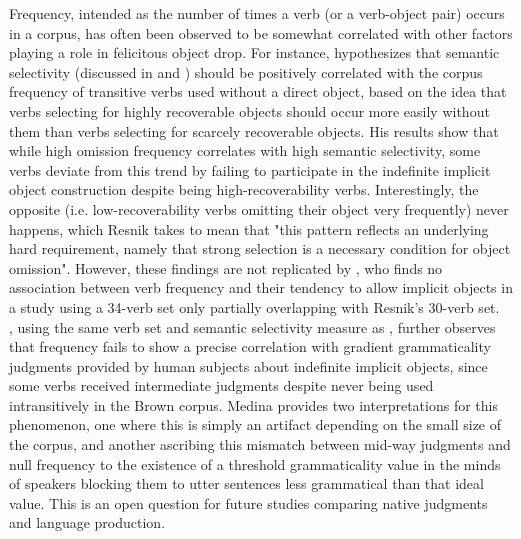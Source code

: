 Frequency, intended as the number of times a verb (or a verb-object pair) occurs in a corpus, has often been observed to be somewhat correlated with other factors playing a role in felicitous object drop. For instance, \textcite[149-151]{Resnik1996} hypothesizes that semantic selectivity (discussed in  and ) should be positively correlated with the corpus frequency of transitive verbs used without a direct object, based on the idea that verbs selecting for highly recoverable objects should occur more easily without them than verbs selecting for scarcely recoverable objects. His results show that while high omission frequency correlates with high semantic selectivity, some verbs deviate from this trend by failing to participate in the indefinite implicit object construction despite being high-recoverability verbs. Interestingly, the opposite (i.e. low-recoverability verbs omitting their object very frequently) never happens, which Resnik takes to mean that "this pattern reflects an underlying hard requirement, namely that strong selection is a necessary condition for object omission". However, these findings are not replicated by \textcite[441]{ruppenhofer2004interaction}, who finds no association between verb frequency and their tendency to allow implicit objects in a study using a 34-verb set only partially overlapping with Resnik's 30-verb set.\\
\textcite[165]{Medina2007}, using the same verb set and semantic selectivity measure as \textcite{Resnik1996}, further observes that frequency fails to show a precise correlation with gradient grammaticality judgments provided by human subjects about indefinite implicit objects, since some verbs received intermediate judgments despite never being used intransitively in the Brown corpus. Medina provides two interpretations for this phenomenon, one where this is simply an artifact depending on the small size of the corpus, and another ascribing this mismatch between mid-way judgments and null frequency to the existence of a threshold grammaticality value in the minds of speakers blocking them to utter sentences less grammatical than that ideal value. This is an open question for future studies comparing native judgments and language production.\\
